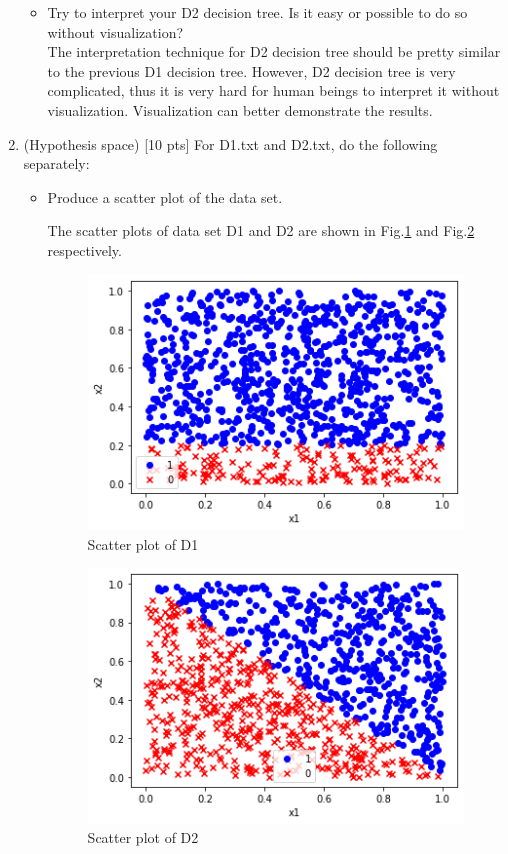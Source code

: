 \documentclass[a4paper]{article}
\theoremstyle{definition}
\begin{document}
\begin{enumerate}
\begin{itemize}
  \item Try to interpret your D2 decision tree. Is it easy or possible to do so without visualization? \\
  {\color{blue} The interpretation technique for D2 decision tree should be pretty similar to the previous D1 decision tree. However, D2 decision tree is very complicated, thus it is very hard for human beings to interpret it without visualization. Visualization can better demonstrate the results.}
  \end{itemize}

\item (Hypothesis space)  [10 pts] For D1.txt and D2.txt, do the following separately:
  \begin{itemize}
  
  \item Produce a scatter plot of the data set.

{\color{blue}
The scatter plots of data set D1 and D2 are shown in Fig.\ref{Q6-1} and Fig.\ref{Q6-2} respectively.
}

\begin{figure}[htbp]
\centering
\includegraphics[width=4in]{Q6-1.png}
\caption{Scatter plot of D1}
\label{Q6-1}
\end{figure}

\begin{figure}[htbp]
\centering
\includegraphics[width=4in]{Q6-2.png}
\caption{Scatter plot of D2}
\label{Q6-2}
\end{figure}


\end{itemize}
\end{enumerate}
\end{document}

